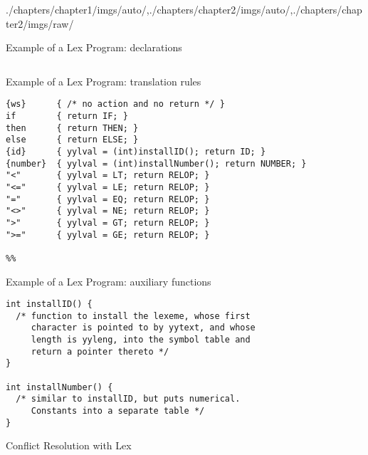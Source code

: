 \begin{graphicspathcontext}{{./chapters/chapter1/imgs/auto/},{./chapters/chapter2/imgs/auto/},{./chapters/chapter2/imgs/raw/}}
\begin{bibunit}[apalike]
\begin{frame}[fragile,background=9]{{Example of a Lex Program:} declarations}
\begin{lstlisting}[style=lststyle-c]
%%
	\end{lstlisting}
\end{frame}

\begin{frame}[fragile,background=6]{{Example of a Lex Program:} translation rules}
	\begin{lstlisting}[style=lststyle-c]
{ws}      { /* no action and no return */ }
if        { return IF; }
then      { return THEN; }
else      { return ELSE; }
{id}      { yylval = (int)installID(); return ID; }
{number}  { yylval = (int)installNumber(); return NUMBER; }
"<"       { yylval = LT; return RELOP; }
"<="      { yylval = LE; return RELOP; }
"="       { yylval = EQ; return RELOP; }
"<>"      { yylval = NE; return RELOP; }
">"       { yylval = GT; return RELOP; }
">="      { yylval = GE; return RELOP; }

%%
	\end{lstlisting}
\end{frame}

\begin{frame}[fragile,background={10}]{{Example of a Lex Program:} auxiliary functions}
	\begin{lstlisting}[style=lststyle-c]
int installID() {
  /* function to install the lexeme, whose first
     character is pointed to by yytext, and whose
     length is yyleng, into the symbol table and
     return a pointer thereto */
}

int installNumber() {
  /* similar to installID, but puts numerical.
     Constants into a separate table */
}
	\end{lstlisting}
\end{frame}

\begin{frame}{{Conflict Resolution} with Lex}
	\begin{center}
		\hspace{1cm}
	\end{center}
\end{frame}


\end{bibunit}
\end{graphicspathcontext}
